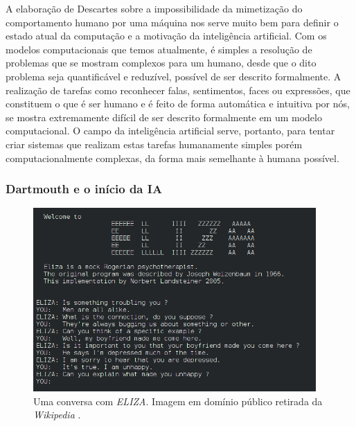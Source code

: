 \documentclass[12pt, a4paper]{article}
\begin{document}
A elaboração de Descartes sobre a impossibilidade da mimetização do comportamento humano por uma máquina nos serve muito bem para definir o estado atual da computação e a motivação da inteligência artificial.
Com os modelos computacionais que temos atualmente, 
é simples a resolução de problemas que se mostram complexos para um humano, 
desde que o dito problema seja quantificável e reduzível, possível de ser descrito formalmente.
A realização de tarefas como reconhecer falas, sentimentos, faces ou expressões, que constituem o que é ser humano e é feito de forma
automática e intuitiva por nós, se mostra extremamente difícil de ser descrito formalmente em um modelo computacional.
O campo da inteligência artificial serve, portanto, para tentar criar sistemas que realizam estas tarefas humanamente simples porém 
computacionalmente complexas, da forma mais semelhante à humana possível.

\subsubsection{Dartmouth e o início da IA}

\begin{figure}[ht!]
	\centering
	\includegraphics[width=\textwidth, height=7cm, keepaspectratio=true]{fig/eliza}
	\caption{
		Uma conversa com \emph{ELIZA}. Imagem em domínio público retirada da \emph{Wikipedia}
		\cite{wikipedia_eliza}.
	}
\end{figure}
\end{document}
